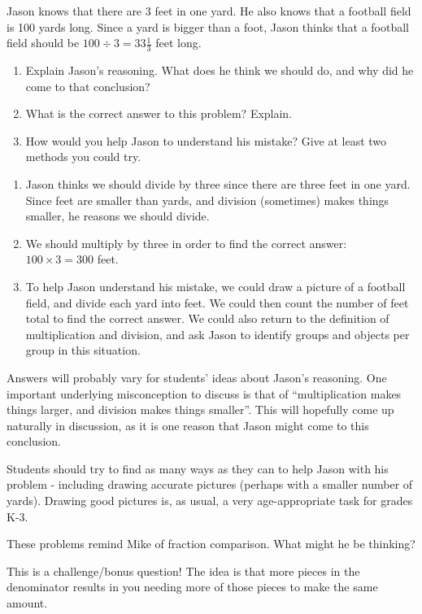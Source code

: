 \documentclass[handout]{ximera}
\begin{document}
\begin{problem}
    Jason knows that there are 3 feet in one yard.  He also knows that a football field is 100 yards long.  Since a yard is bigger than a foot, Jason thinks that a football field should be $100 \div 3 = 33 \frac{1}{3}$ feet long.
    \begin{enumerate}
    \item Explain Jason's reasoning.  What does he think we should do, and why did he come to that conclusion?
    \item What is the correct answer to this problem? Explain.
    \item How would you help Jason to understand his mistake?  Give at least two methods you could try.
    \end{enumerate}
    
    \begin{solution}
        \begin{enumerate}
        \item Jason thinks we should divide by three since there are three feet in one yard.  Since feet are smaller than yards, and division (sometimes) makes things smaller, he reasons we should divide.
        \item We should multiply by three in order to find the correct answer: $100 \times 3 = 300$ feet.
        \item To help Jason understand his mistake, we could draw a picture of a football field, and divide each yard into feet.  We could then count the number of feet total to find the correct answer.  We could also return to the definition of multiplication and division, and ask Jason to identify groups and objects per group in this situation.
        \end{enumerate}
    \end{solution}
    
    \begin{instructorNotes}
    Answers will probably vary for students' ideas about Jason's reasoning.  One important underlying misconception to discuss is that of ``multiplication makes things larger, and division makes things smaller''.  This will hopefully come up naturally in discussion, as it is one reason that Jason might come to this conclusion.  
    
    Students should try to find as many ways as they can to help Jason with his problem - including drawing accurate pictures (perhaps with a smaller number of yards).  Drawing good pictures is, as usual, a very age-appropriate task for grades K-3.
    \end{instructorNotes}
\end{problem}


\begin{problem}
These problems remind Mike of fraction comparison.  What might he be thinking?

\begin{instructorNotes}
This is a challenge/bonus question!  The idea is that more pieces in the denominator results in you needing more of those pieces to make the same amount.
\end{instructorNotes}
\end{problem}
\end{document}
